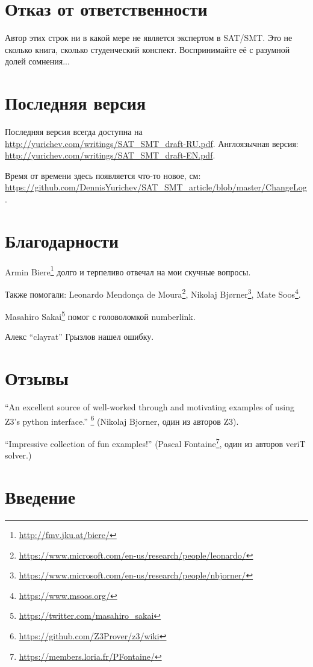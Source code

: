 \section{Отказ от ответственности}

Автор этих строк ни в какой мере не является экспертом в SAT/SMT.
Это не сколько книга, сколько студенческий конспект.
Воспринимайте её с разумной долей сомнения...

\section{Последняя версия}

Последняя версия всегда доступна на \url{http://yurichev.com/writings/SAT_SMT_draft-RU.pdf}.
Англоязычная версия: \url{http://yurichev.com/writings/SAT_SMT_draft-EN.pdf}.

Время от времени здесь появляется что-то новое, см: \url{https://github.com/DennisYurichev/SAT_SMT_article/blob/master/ChangeLog}.

\section{Благодарности}

Armin Biere\footnote{\url{http://fmv.jku.at/biere/}} долго и терпеливо отвечал на мои скучные вопросы.

Также помогали:
Leonardo Mendonça de Moura\footnote{\url{https://www.microsoft.com/en-us/research/people/leonardo/}},
Nikolaj Bjørner\footnote{\url{https://www.microsoft.com/en-us/research/people/nbjorner/}},
Mate Soos\footnote{\url{https://www.msoos.org/}}.

Masahiro Sakai\footnote{\url{https://twitter.com/masahiro_sakai}} помог с головоломкой numberlink.

Алекс ``clayrat'' Грызлов нашел ошибку.

\section{Отзывы}

``An excellent source of well-worked through and motivating examples of using Z3's python interface.''
\footnote{\url{https://github.com/Z3Prover/z3/wiki}}
(Nikolaj Bjorner, один из авторов Z3).

``Impressive collection of fun examples!''
(Pascal Fontaine\footnote{\url{https://members.loria.fr/PFontaine/}}, один из авторов veriT solver.)

\section{Введение}

